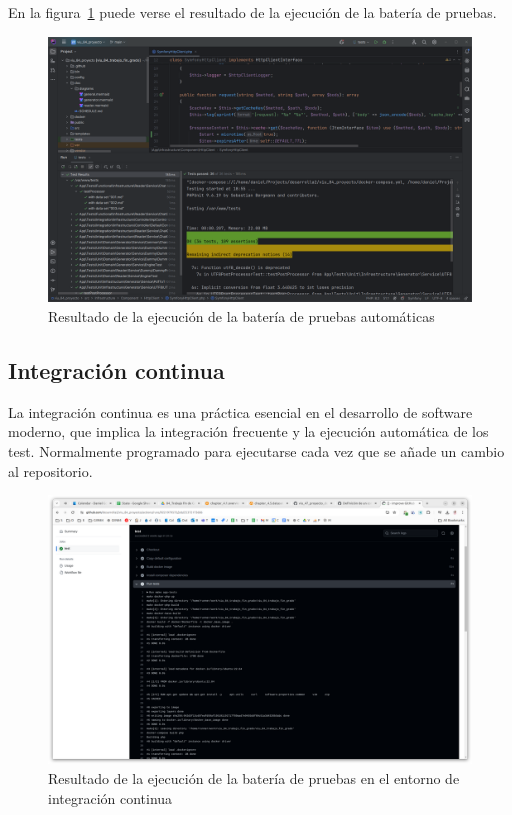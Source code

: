 En la figura~\ref{fig:chapter_4.5.test_suite_execution} puede verse el resultado de la ejecución de la batería de
pruebas.

\begin{figure}[ht]
    \begin{center}
        \includegraphics[width=\textwidth]{./chapter/4/images/chapter_4.5.test_suite_execution}
        \caption{Resultado de la ejecución de la batería de pruebas automáticas}
        \label{fig:chapter_4.5.test_suite_execution}
    \end{center}
\end{figure}

\subsection{Integración continua}
La integración continua es una práctica esencial en el desarrollo de software moderno, que implica la integración
frecuente y la ejecución automática de los test.
Normalmente programado para ejecutarse cada vez que se añade un cambio al repositorio.

\begin{figure}[ht]
    \begin{center}
        \includegraphics[width=\textwidth]{./chapter/4/images/chapter_4.5.github_actions_execution}
        \caption{Resultado de la ejecución de la batería de pruebas en el entorno de integración continua}
        \label{fig:chapter_4.5.github_actions_execution}
    \end{center}
\end{figure}

